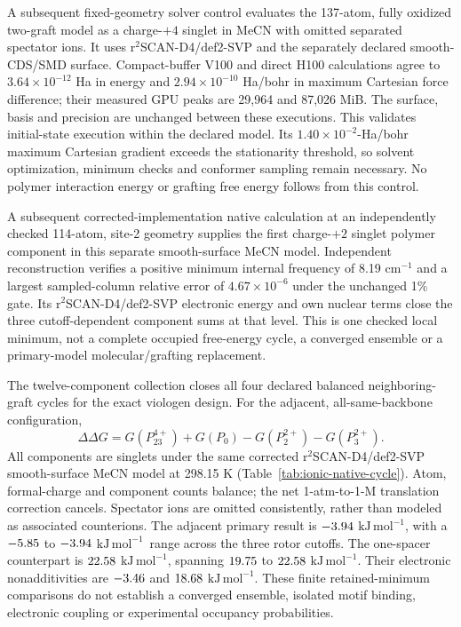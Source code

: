 \documentclass[11pt]{article}
\newcommand{\kj}{\ensuremath{\mathrm{kJ\,mol^{-1}}}}
\begin{document}
A subsequent fixed-geometry solver control evaluates the 137-atom, fully oxidized two-graft model as a charge-$+4$ singlet in MeCN with omitted separated spectator ions. It uses r$^2$SCAN-D4/def2-SVP and the separately declared smooth-CDS/SMD surface. Compact-buffer V100 and direct H100 calculations agree to $3.64\times10^{-12}$ Ha in energy and $2.94\times10^{-10}$ Ha/bohr in maximum Cartesian force difference; their measured GPU peaks are 29,964 and 87,026 MiB. The surface, basis and precision are unchanged between these executions. This validates initial-state execution within the declared model. Its $1.40\times10^{-2}$-Ha/bohr maximum Cartesian gradient exceeds the stationarity threshold, so solvent optimization, minimum checks and conformer sampling remain necessary. No polymer interaction energy or grafting free energy follows from this control.

A subsequent corrected-implementation native calculation at an independently checked 114-atom, site-2 geometry supplies the first charge-$+2$ singlet polymer component in this separate smooth-surface MeCN model. Independent reconstruction verifies a positive minimum internal frequency of 8.19 cm$^{-1}$ and a largest sampled-column relative error of $4.67\times10^{-6}$ under the unchanged 1\% gate. Its r$^2$SCAN-D4/def2-SVP electronic energy and own nuclear terms close the three cutoff-dependent component sums at that level. This is one checked local minimum, not a complete occupied free-energy cycle, a converged ensemble or a primary-model molecular/grafting replacement.

The twelve-component collection closes all four declared balanced neighboring-graft cycles for the exact viologen design. For the adjacent, all-same-backbone configuration,
\begin{equation}
\Delta\Delta G=G(P_{23}^{4+})+G(P_0)-G(P_2^{2+})-G(P_3^{2+}).
\end{equation}
All components are singlets under the same corrected r$^2$SCAN-D4/def2-SVP smooth-surface MeCN model at 298.15 K (Table~\ref{tab:ionic-native-cycle}). Atom, formal-charge and component counts balance; the net 1-atm-to-1-M translation correction cancels. Spectator ions are omitted consistently, rather than modeled as associated counterions. The adjacent primary result is $-3.94$ \kj, with a $-5.85$ to $-3.94$ \kj\ range across the three rotor cutoffs. The one-spacer counterpart is $22.58$ \kj, spanning $19.75$ to $22.58$ \kj. Their electronic nonadditivities are $-3.46$ and $18.68$ \kj. These finite retained-minimum comparisons do not establish a converged ensemble, isolated motif binding, electronic coupling or experimental occupancy probabilities.
\end{document}
